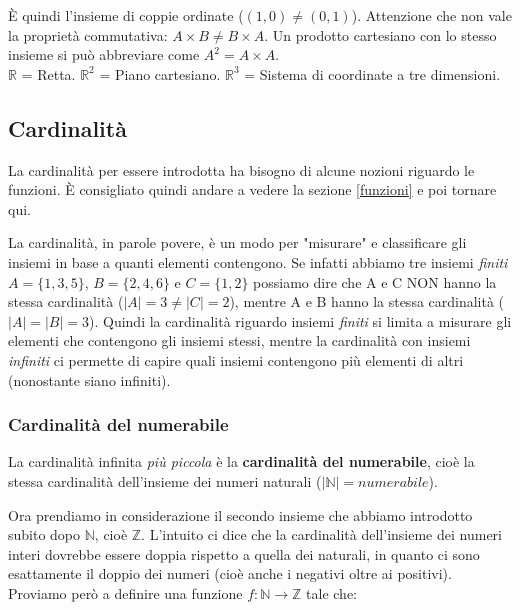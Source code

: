 È quindi l'insieme di coppie ordinate ($(1, 0) \neq (0, 1)$). Attenzione che non vale la proprietà commutativa: $A\times B \neq B\times A$. Un prodotto cartesiano con lo stesso insieme si può abbreviare come $A^2 = A\times A$.\\ 

$\mathbb{R}$ = Retta. $\mathbb{R}^2$ = Piano cartesiano. $\mathbb{R}^3$ = Sistema di coordinate a tre dimensioni. %

\subsection{Cardinalità}
La cardinalità per essere introdotta ha bisogno di alcune nozioni riguardo le funzioni. È consigliato quindi andare a vedere la sezione \ref{funzioni} e poi tornare qui.\\



La cardinalità, in parole povere, è un modo per "misurare" e classificare gli insiemi in base a quanti elementi contengono. Se infatti abbiamo tre insiemi \textit{finiti} $A=\{1, 3, 5\}$, $B=\{2, 4, 6\}$ e $C=\{1, 2\}$ possiamo dire che A e C NON hanno la stessa cardinalità ($|A|=3 \neq |C| = 2$), mentre A e B hanno la stessa cardinalità ($|A| = |B| = 3$). Quindi la cardinalità riguardo insiemi \textit{finiti} si limita a misurare gli elementi che contengono gli insiemi stessi, mentre la cardinalità con insiemi \textit{infiniti} ci permette di capire quali insiemi contengono più elementi di altri (nonostante siano infiniti).\\

\subsubsection{Cardinalità del numerabile}

La cardinalità infinita \textit{più piccola} è la \textbf{cardinalità del numerabile}, cioè la stessa cardinalità dell'insieme dei numeri naturali ($|\mathbb{N}| = numerabile$).

Ora prendiamo in considerazione il secondo insieme che abbiamo introdotto subito dopo $\mathbb{N}$, cioè $\mathbb{Z}.$ L'intuito ci dice che la cardinalità dell'insieme dei numeri interi dovrebbe essere doppia rispetto a quella dei naturali, in quanto ci sono esattamente il doppio dei numeri (cioè anche i negativi oltre ai positivi). Proviamo però a definire una funzione $f: \mathbb{N} \to \mathbb{Z}$ tale che:

